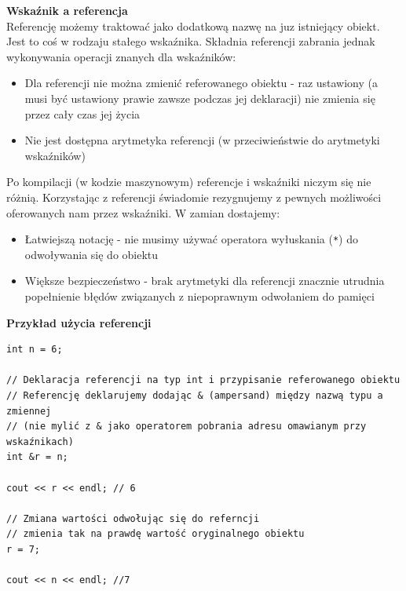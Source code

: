 \documentclass[12pt]{article}
\begin{document}
    \begin{definition}
    \textbf{Wskaźnik a referencja} \\
    Referencję możemy traktować jako dodatkową nazwę na juz istniejący obiekt. Jest to coś w rodzaju stałego wskaźnika.
    Składnia referencji zabrania jednak wykonywania operacji znanych dla wskaźników:
    \begin{itemize}
        \item Dla referencji nie można zmienić referowanego obiektu - raz ustawiony (a musi być ustawiony prawie zawsze podczas jej deklaracji) nie zmienia się przez cały czas jej życia
        \item Nie jest dostępna arytmetyka referencji (w przeciwieństwie do arytmetyki wskaźników)
    \end{itemize}
    Po kompilacji (w kodzie maszynowym) referencje i wskaźniki niczym się nie różnią.
    Korzystając z referencji świadomie rezygnujemy z pewnych możliwości oferowanych nam przez wskaźniki. W zamian dostajemy:
    \begin{itemize}
	\item Łatwiejszą notację - nie musimy używać operatora wyłuskania (\texttt{*}) do odwoływania się do obiektu
	\item Większe bezpieczeństwo - brak arytmetyki dla referencji znacznie utrudnia popełnienie błędów związanych z niepoprawnym odwołaniem do pamięci
    \end{itemize}
    \end{definition}
    
    \noindent \textbf{Przykład użycia referencji}
    \begin{verbatim}
int n = 6;

// Deklaracja referencji na typ int i przypisanie referowanego obiektu
// Referencję deklarujemy dodając & (ampersand) między nazwą typu a zmiennej
// (nie mylić z & jako operatorem pobrania adresu omawianym przy wskaźnikach)
int &r = n;

cout << r << endl; // 6

// Zmiana wartości odwołując się do referncji
// zmienia tak na prawdę wartość oryginalnego obiektu
r = 7;

cout << n << endl; //7
    \end{verbatim}    
    
    \newpage
    
\end{document}
